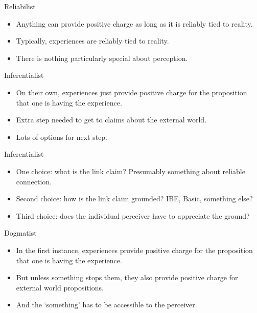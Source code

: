 \documentclass[
  17pt,
  letterpaper,
  ignorenonframetext,
  aspectratio=169,
  xcolor={dvipsnames}]{beamer}
\providecommand{\tightlist}{%
  \setlength{\itemsep}{0pt}\setlength{\parskip}{0pt}}\usepackage{longtable,booktabs,array}
\begin{document}
\begin{frame}{Reliabilist}
\protect\hypertarget{reliabilist}{}
\begin{itemize}[<+->]
\tightlist
\item
  Anything can provide positive charge as long as it is reliably tied to
  reality.
\item
  Typically, experiences are reliably tied to reality.
\item
  There is nothing particularly special about perception.
\end{itemize}
\end{frame}

\begin{frame}{Inferentialist}
\protect\hypertarget{inferentialist}{}
\begin{itemize}[<+->]
\tightlist
\item
  On their own, experiences just provide positive charge for the
  proposition that one is having the experience.
\item
  Extra step needed to get to claims about the external world.
\item
  Lots of options for next step.
\end{itemize}
\end{frame}

\begin{frame}{Inferentialist}
\protect\hypertarget{inferentialist-1}{}
\begin{itemize}[<+->]
\tightlist
\item
  One choice: what is the link claim? Presumably something about
  reliable connection.
\item
  Second choice: how is the link claim grounded? IBE, Basic, something
  else?
\item
  Third choice: does the individual perceiver have to appreciate the
  ground?
\end{itemize}
\end{frame}

\begin{frame}{Dogmatist}
\protect\hypertarget{dogmatist}{}
\begin{itemize}[<+->]
\tightlist
\item
  In the first instance, experiences provide positive charge for the
  proposition that one is having the experience.
\item
  But unless something stops them, they also provide positive charge for
  external world propositions.
\item
  And the `something' has to be accessible to the perceiver.
\end{itemize}
\end{frame}
\end{document}
